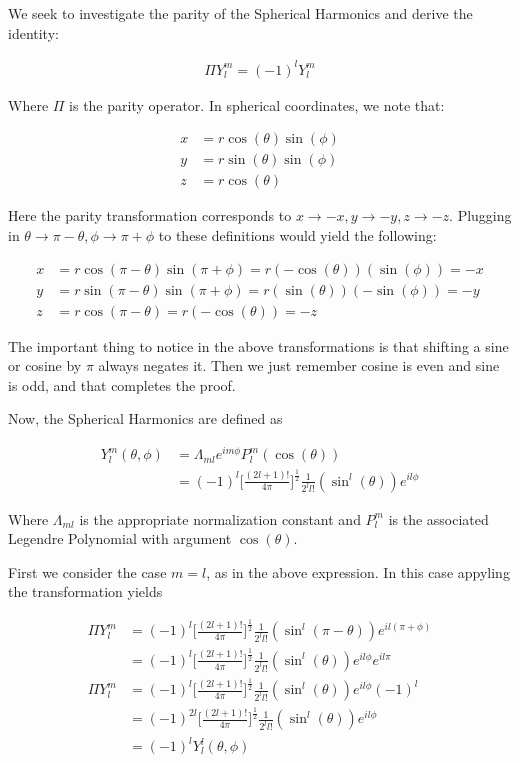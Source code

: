 \documentclass[paper=a4, fontsize=11pt]{scrartcl} %
\numberwithin{equation}{section} %
\numberwithin{figure}{section} %
\numberwithin{table}{section} %
\begin{document}
We seek to investigate the parity of the Spherical Harmonics and derive the identity:

\begin{align}
\Pi Y^m_l = (-1)^l Y^m_l
\end{align}

Where $\Pi$ is the parity operator. In spherical coordinates, we note that:

\begin{align}
x &= r \cos(\theta) \sin(\phi) \\
y &= r \sin(\theta) \sin(\phi) \\
z &= r \cos(\theta) 
\end{align}

Here the parity transformation corresponds to $x \rightarrow -x, y \rightarrow -y, z \rightarrow -z$. Plugging in $\theta \rightarrow \pi - \theta, \phi \rightarrow \pi + \phi$ to these definitions would yield the following:

\begin{align}
x &= r \cos(\pi - \theta) \sin(\pi + \phi) = r (-\cos(\theta))(\sin(\phi)) = -x \\
y &= r \sin(\pi - \theta) \sin(\pi + \phi) = r (\sin(\theta))(-\sin(\phi)) = -y  \\
z &= r \cos(\pi - \theta) = r(-\cos(\theta)) = -z 
\end{align}

The important thing to notice in the above transformations is that shifting a sine or cosine by $\pi$ always negates it. Then we just remember cosine is even and sine is odd, and that completes the proof. 

Now, the Spherical Harmonics are defined as 

\begin{align}
Y^m_l(\theta, \phi) &= \Lambda_{ml}e^{i m \phi} P^m_l(\cos(\theta)) \\ 
&= (-1)^l \bigg[ \frac{(2l + 1)!}{4 \pi} \bigg]^{\frac{1}{2}} \frac{1}{2^l l!}(\sin^l(\theta))e^{i l \phi}
\end{align}

Where $\Lambda_{ml}$ is the appropriate normalization constant and $P^m_l$ is the associated Legendre Polynomial with argument $\cos(\theta)$.

First we consider the case $m=l$, as in the above expression. In this case appyling the transformation yields

\begin{align}
\Pi Y^m_l &= (-1)^l \bigg[ \frac{(2l + 1)!}{4 \pi} \bigg]^{\frac{1}{2}} \frac{1}{2^l l!}(\sin^l(\pi - \theta))e^{i l (\pi + \phi)} \\ 
&= (-1)^l \bigg[ \frac{(2l + 1)!}{4 \pi} \bigg]^{\frac{1}{2}} \frac{1}{2^l l!}(\sin^l(\theta))e^{i l \phi} e^{i l \pi} \\  
\Pi Y^m_l &= (-1)^l \bigg[ \frac{(2l + 1)!}{4 \pi} \bigg]^{\frac{1}{2}} \frac{1}{2^l l!}(\sin^l(\theta))e^{i l \phi}(-1)^l \\  
&= (-1)^{2 l} \bigg[ \frac{(2l + 1)!}{4 \pi} \bigg]^{\frac{1}{2}} \frac{1}{2^l l!}(\sin^l(\theta))e^{i l \phi} \\  
&= (-1)^l Y^l_l(\theta,\phi)
\end{align}
\end{document}
